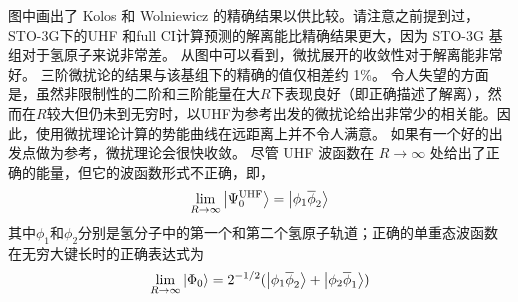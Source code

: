 图中画出了 Kolos 和 Wolniewicz 的精确结果以供比较。请注意之前提到过，STO-3G下的UHF 和full CI计算预测的解离能比精确结果更大，因为 STO-3G 基组对于氢原子来说非常差。 从图中可以看到，微扰展开的收敛性对于解离能非常好。 三阶微扰论的结果与该基组下的精确的值仅相差约 1\%。 令人失望的方面是，虽然非限制性的二阶和三阶能量在大$R$下表现良好（即正确描述了解离），然而在$R$较大但仍未到无穷时，以UHF为参考出发的微扰论给出非常少的相关能。因此，使用微扰理论计算的势能曲线在远距离上并不令人满意。 如果有一个好的出发点做为参考，微扰理论会很快收敛。 尽管 UHF 波函数在 $R\to\infty$ 处给出了正确的能量，但它的波函数形式不正确，即，
\begin{align}
	\lim_{R\to\infty} \Ket{\Psi_0^\mathrm{UHF}} = \Ket{\phi_1\overline{\phi}_2}
\end{align}
其中$\phi_1$和$\phi_2$分别是氢分子中的第一个和第二个氢原子轨道；正确的单重态波函数在无穷大键长时的正确表达式为
\begin{align}
	\lim_{R\to\infty}\Ket{\Phi_0} = 2^{-1/2}(\Ket{\phi_1\overline{\phi}_2}+\Ket{\phi_2\overline{\phi}_1})
\end{align}
